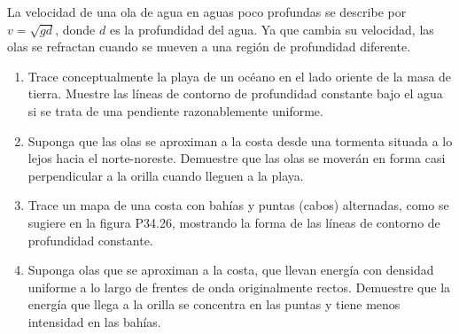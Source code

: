 \item La velocidad de una ola de agua en aguas poco profundas se describe por $v = \sqrt{gd}$, donde $d$ es la profundidad del agua. Ya que cambia su velocidad, las olas se refractan cuando se mueven a una región de profundidad diferente.
\begin{enumerate}
    \item Trace conceptualmente la playa de un océano en el lado oriente de la masa de tierra. Muestre las líneas de contorno de profundidad constante bajo el agua si se trata de una pendiente razonablemente uniforme.
    \item Suponga que las olas se aproximan a la costa desde una tormenta situada a lo lejos hacia el norte-noreste. Demuestre que las olas se moverán en forma casi perpendicular a la orilla cuando lleguen a la playa.
    \item Trace un mapa de una costa con bahías y puntas (cabos) alternadas, como se sugiere en la figura P34.26, mostrando la forma de las líneas de contorno de profundidad constante.
    \item Suponga olas que se aproximan a la costa, que llevan energía con densidad uniforme a lo largo de frentes de onda originalmente rectos. Demuestre que la energía que llega a la orilla se concentra en las puntas y tiene menos intensidad en las bahías.
\end{enumerate}